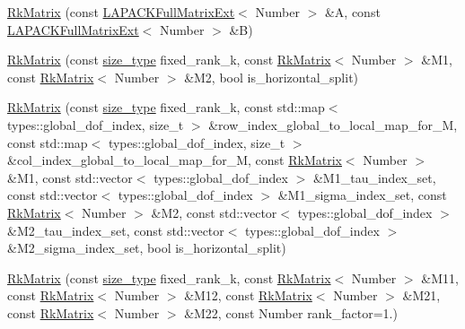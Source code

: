 \begin{DoxyCompactItemize}
\item 
\hyperlink{classRkMatrix_a22cbf825bdbff58434ab3d4a6c478b96}{Rk\+Matrix} (const \hyperlink{classLAPACKFullMatrixExt}{L\+A\+P\+A\+C\+K\+Full\+Matrix\+Ext}$<$ Number $>$ \&A, const \hyperlink{classLAPACKFullMatrixExt}{L\+A\+P\+A\+C\+K\+Full\+Matrix\+Ext}$<$ Number $>$ \&B)
\item 
\hyperlink{classRkMatrix_ae15a15d55d04dd677a8dc90dbf789674}{Rk\+Matrix} (const \hyperlink{classRkMatrix_add060bfc3a4cc77f858c3d6dd58cadd5}{size\+\_\+type} fixed\+\_\+rank\+\_\+k, const \hyperlink{classRkMatrix}{Rk\+Matrix}$<$ Number $>$ \&M1, const \hyperlink{classRkMatrix}{Rk\+Matrix}$<$ Number $>$ \&M2, bool is\+\_\+horizontal\+\_\+split)
\item 
\hyperlink{classRkMatrix_a0ef50f2d8d07bcbffa0a6d015dc0d1a4}{Rk\+Matrix} (const \hyperlink{classRkMatrix_add060bfc3a4cc77f858c3d6dd58cadd5}{size\+\_\+type} fixed\+\_\+rank\+\_\+k, const std\+::map$<$ types\+::global\+\_\+dof\+\_\+index, size\+\_\+t $>$ \&row\+\_\+index\+\_\+global\+\_\+to\+\_\+local\+\_\+map\+\_\+for\+\_\+M, const std\+::map$<$ types\+::global\+\_\+dof\+\_\+index, size\+\_\+t $>$ \&col\+\_\+index\+\_\+global\+\_\+to\+\_\+local\+\_\+map\+\_\+for\+\_\+M, const \hyperlink{classRkMatrix}{Rk\+Matrix}$<$ Number $>$ \&M1, const std\+::vector$<$ types\+::global\+\_\+dof\+\_\+index $>$ \&M1\+\_\+tau\+\_\+index\+\_\+set, const std\+::vector$<$ types\+::global\+\_\+dof\+\_\+index $>$ \&M1\+\_\+sigma\+\_\+index\+\_\+set, const \hyperlink{classRkMatrix}{Rk\+Matrix}$<$ Number $>$ \&M2, const std\+::vector$<$ types\+::global\+\_\+dof\+\_\+index $>$ \&M2\+\_\+tau\+\_\+index\+\_\+set, const std\+::vector$<$ types\+::global\+\_\+dof\+\_\+index $>$ \&M2\+\_\+sigma\+\_\+index\+\_\+set, bool is\+\_\+horizontal\+\_\+split)
\item 
\hyperlink{classRkMatrix_ab2826404ecbffa257d56feac015a4c5f}{Rk\+Matrix} (const \hyperlink{classRkMatrix_add060bfc3a4cc77f858c3d6dd58cadd5}{size\+\_\+type} fixed\+\_\+rank\+\_\+k, const \hyperlink{classRkMatrix}{Rk\+Matrix}$<$ Number $>$ \&M11, const \hyperlink{classRkMatrix}{Rk\+Matrix}$<$ Number $>$ \&M12, const \hyperlink{classRkMatrix}{Rk\+Matrix}$<$ Number $>$ \&M21, const \hyperlink{classRkMatrix}{Rk\+Matrix}$<$ Number $>$ \&M22, const Number rank\+\_\+factor=1.)
\item 

\end{DoxyCompactItemize}
